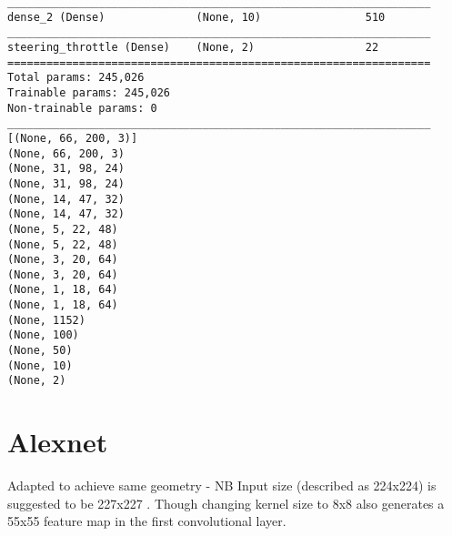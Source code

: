 \begin{verbatim}
_________________________________________________________________
dense_2 (Dense)              (None, 10)                510       
_________________________________________________________________
steering_throttle (Dense)    (None, 2)                 22        
=================================================================
Total params: 245,026    
Trainable params: 245,026
Non-trainable params: 0
_________________________________________________________________
[(None, 66, 200, 3)]
(None, 66, 200, 3)
(None, 31, 98, 24)
(None, 31, 98, 24)
(None, 14, 47, 32)
(None, 14, 47, 32)
(None, 5, 22, 48)
(None, 5, 22, 48)
(None, 3, 20, 64)
(None, 3, 20, 64)
(None, 1, 18, 64)
(None, 1, 18, 64)
(None, 1152)
(None, 100)
(None, 50)
(None, 10)
(None, 2)

\end{verbatim}


\section{Alexnet}
Adapted to achieve same geometry - NB Input size (described as 224x224) is suggested to  be 227x227 \cite{CS231n}. 
Though changing kernel size to 8x8 also generates a 55x55 feature map in the first convolutional layer.

